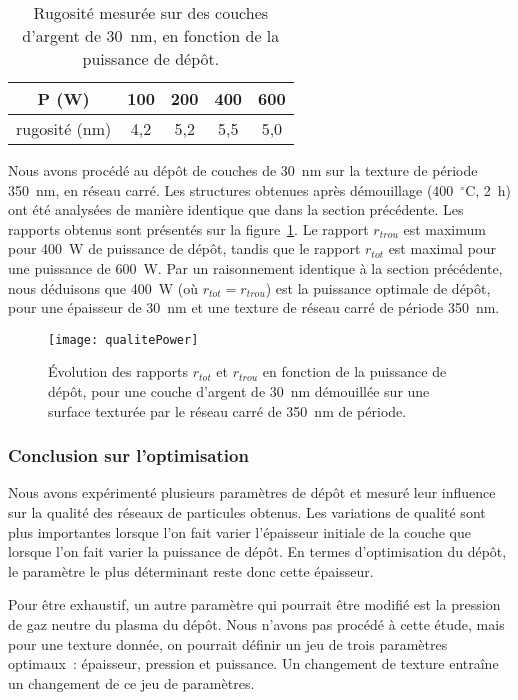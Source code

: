 \begin{table}[!htb]
\centering
\begin{tabular}{ccccc}
\hline
P (W) & 100 & 200 & 400 & 600 \\
\hline
rugosité (nm) & 4,2 & 5,2 & 5,5 & 5,0\\
\hline
\end{tabular}
\caption{Rugosité mesurée sur des couches d'argent de 30~nm, en fonction de la puissance de dépôt.}
\label{tRguoPower}
\end{table}
Nous avons procédé au dépôt de couches de 30~nm sur la texture de période 350~nm, en réseau carré. Les structures obtenues après démouillage (400~$^\circ$C, 2~h) ont été analysées de manière identique que dans la section précédente. Les rapports obtenus sont présentés sur la figure~\ref{qualitePower}. Le rapport $r_{trou}$ est maximum pour 400~W de puissance de dépôt, tandis que le rapport $r_{tot}$ est maximal pour une puissance de 600~W. Par un raisonnement identique à la section précédente, nous déduisons que 400~W (où $r_{tot}=r_{trou}$) est la puissance optimale de dépôt, pour une épaisseur de 30~nm et une texture de réseau carré de période 350~nm.\par 
\begin{figure}[!htb]
\centering
\texttt{[image: qualitePower]}
\caption{Évolution des rapports $r_{tot}$ et $r_{trou}$ en fonction de la puissance de dépôt, pour une couche d'argent de 30~nm démouillée sur une surface texturée par le réseau carré de 350~nm de période.}
\label{qualitePower}
\end{figure}

\subsubsection{Conclusion sur l'optimisation}
Nous avons expérimenté plusieurs paramètres de dépôt et mesuré leur influence sur la qualité des réseaux de particules obtenus. Les variations de qualité sont plus importantes lorsque l'on fait varier l'épaisseur initiale de la couche que lorsque l'on fait varier la puissance de dépôt. En termes d'optimisation du dépôt, le paramètre le plus déterminant reste donc  cette épaisseur.\par 
Pour être exhaustif, un autre paramètre qui pourrait être modifié est la pression de gaz neutre du plasma du dépôt. Nous n'avons pas procédé à cette étude, mais pour une texture donnée, on pourrait définir un jeu de trois paramètres optimaux~: épaisseur, pression et puissance. Un changement de texture entraîne un changement de ce jeu de paramètres.\par 

